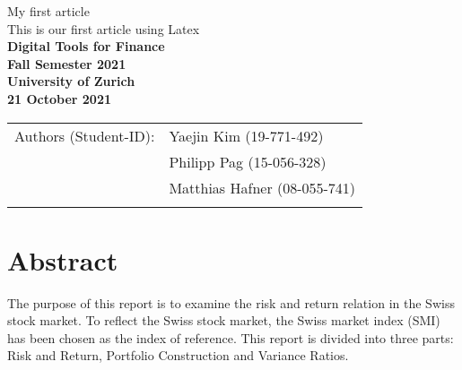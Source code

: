 \documentclass{article}
\begin{document}
\vspace*{3cm}

\begin{center}

\thispagestyle{empty}

{\Huge My first article}\\[0.5cm]
{\LARGE This is our first article using Latex}\\[1.5cm]

{\Large \bf Digital Tools for Finance}\\[1cm]

{\bf \large Fall Semester 2021\\
University of Zurich}\\[1cm]

{\large \bf 21 October 2021}\\[3cm]


\begin{tabular}{ll}
\hline
{Authors (Student-ID):} & { Yaejin Kim (19-771-492)}\\
& { Philipp Pag (15-056-328)}\\
& { Matthias Hafner (08-055-741) }\\
\hline \\
\end{tabular}



\end{center}


\newpage


\section*{Abstract}
 
The purpose of this report is to examine the risk and return relation in the Swiss stock market. To reflect the Swiss stock market, the Swiss market index (SMI) has been chosen as the index of reference. This report is divided into three parts: Risk and Return, Portfolio Construction and Variance Ratios.



\newpage

\blindtext

\newpage

\blindtext

\newpage
\end{document}
